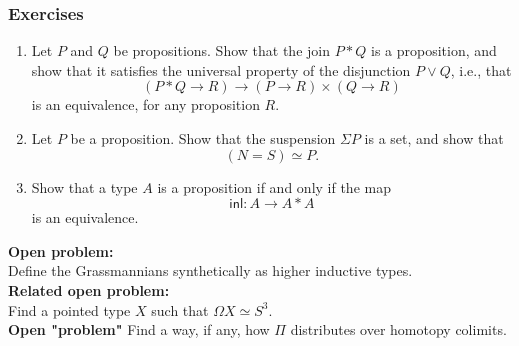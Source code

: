 \documentclass[handout]{beamer}
\newcommand{\sphere}[1]{S^{#1}}
\begin{document}
\begin{frame}
  \frametitle{Exercises}
  \begin{enumerate}
  \item Let $P$ and $Q$ be propositions. Show that the join $P\ast Q$ is a proposition, and show that it satisfies the universal property of the disjunction $P\vee Q$, i.e., that
    \begin{equation*}
      (P\ast Q\to R)\to (P\to R)\times(Q\to R)
    \end{equation*}
    is an equivalence, for any proposition $R$.
  \item Let $P$ be a proposition. Show that the suspension $\Sigma P$ is a set, and show that
    \begin{equation*}
      (N=S)\simeq P.
    \end{equation*}
  \item Show that a type $A$ is a proposition if and only if the map
    \begin{equation*}
      \mathsf{inl} : A \to A\ast A
    \end{equation*}
    is an equivalence.
  \end{enumerate}
\end{frame}

\begin{frame}
  \textbf{Open problem:}\\
  Define the Grassmannians synthetically as higher inductive types.\\[\baselineskip]
  \textbf{Related open problem:}\\
  Find a pointed type $X$ such that $\Omega X\simeq \sphere{3}$.\\[\baselineskip]
  \textbf{Open "problem"}
  Find a way, if any, how $\Pi$ distributes over homotopy colimits.
\end{frame}
\end{document}
